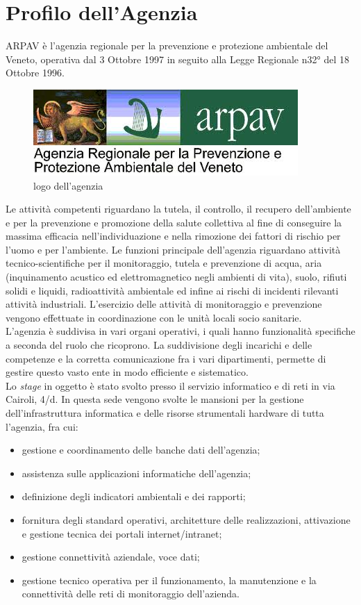 \chapter{Profilo dell'Agenzia}
\label{1.0}
\thispagestyle{fancy} 

ARPAV è l'agenzia regionale per la prevenzione e protezione ambientale del Veneto, operativa dal 3 Ottobre 1997 in seguito alla Legge Regionale n32° del 18 Ottobre 1996.

\begin{figure}[htbp]
	\centering
	\includegraphics[scale=0.7]{./capitoli/capitolo1/img/logoARPAV.jpg}
	\caption{logo dell'agenzia}
\end{figure}

Le attività competenti riguardano la tutela, il controllo, il recupero dell'ambiente e per la prevenzione e promozione della salute collettiva al fine di conseguire la massima efficacia nell'individuazione e nella rimozione dei fattori di rischio per l'uomo e per l'ambiente. Le funzioni principale dell'agenzia riguardano attività tecnico-scientifiche per il monitoraggio, tutela e prevenzione di acqua, aria (inquinamento acustico ed elettromagnetico negli ambienti di vita), suolo, rifiuti solidi e liquidi, radioattività ambientale ed infine ai rischi di incidenti rilevanti attività industriali. L'esercizio delle attività di monitoraggio e prevenzione vengono effettuate in coordinazione con le unità locali socio sanitarie.\\
L'agenzia è suddivisa in vari organi operativi, i quali hanno funzionalità specifiche a seconda del ruolo che ricoprono. La suddivisione degli incarichi e delle competenze e la corretta comunicazione fra i vari dipartimenti, permette di gestire questo vasto ente in modo efficiente e sistematico.\\
Lo \textit{stage} in oggetto è stato svolto presso il servizio informatico e di reti in via Cairoli, 4/d. In questa sede vengono svolte le mansioni per la gestione dell'infrastruttura informatica e delle risorse strumentali hardware di tutta l'agenzia, fra cui:
\begin{itemize}
	\item gestione e coordinamento delle banche dati dell'agenzia;
	\item assistenza sulle applicazioni informatiche dell'agenzia;
	\item definizione degli indicatori ambientali e dei rapporti;
	\item fornitura degli standard operativi, architetture delle realizzazioni, attivazione e gestione tecnica dei portali internet/intranet;
	\item gestione connettività aziendale, voce dati;
	\item gestione tecnico operativa per il funzionamento, la manutenzione e la connettività delle reti di monitoraggio dell'azienda.
\end{itemize} 


